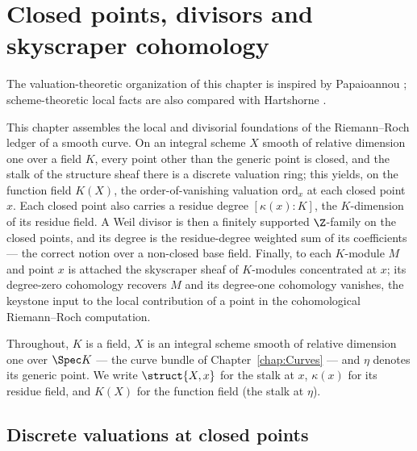 \chapter{Closed points, divisors and skyscraper cohomology}
\label{chap:RiemannRoch}

The valuation-theoretic organization of this chapter is inspired by Papaioannou
\cite{papaioannou-rr}; scheme-theoretic local facts are also compared with Hartshorne
\cite{hartshorne-ag}.

This chapter assembles the local and divisorial foundations of the Riemann--Roch ledger of a
smooth curve. On an integral scheme \(X\) smooth of relative dimension one over a field \(K\),
every point other than the generic point is closed, and the stalk of the structure sheaf there
is a discrete valuation ring; this yields, on the function field \(K(X)\), the order-of-vanishing
valuation \(\mathrm{ord}_x\) at each closed point \(x\). Each closed point also carries a residue
degree \([\kappa(x) : K]\), the \(K\)-dimension of its residue field. A Weil divisor is then a
finitely supported \(\Z\)-family on the closed points, and its degree is the residue-degree
weighted sum of its coefficients --- the correct notion over a non-closed base field. Finally, to
each \(K\)-module \(M\) and point \(x\) is attached the skyscraper sheaf of \(K\)-modules
concentrated at \(x\); its degree-zero cohomology recovers \(M\) and its degree-one cohomology
vanishes, the keystone input to the local contribution of a point in the cohomological
Riemann--Roch computation.

Throughout, \(K\) is a field, \(X\) is an integral scheme smooth of relative dimension one over
\(\Spec K\) --- the curve bundle of Chapter~\ref{chap:Curves} --- and \(\eta\) denotes its generic
point. We write \(\struct{X,x}\) for the stalk at \(x\), \(\kappa(x)\) for its residue field,
and \(K(X)\) for the function field (the stalk at \(\eta\)).

\section{Discrete valuations at closed points}

